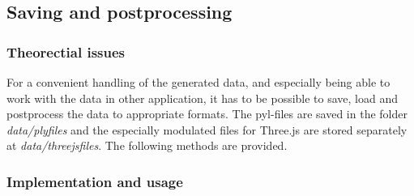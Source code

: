 \documentclass[paper=a4,11pt,bibliography=totoc]{scrartcl}
\begin{document}
\subsection{Saving and postprocessing}
\subsubsection*{\color{darkgreen}Theorectial issues}
%
For a convenient handling of the generated data, and especially being able to work with the data in other application, it has to be possible to save, load and postprocess the data to appropriate formats. The pyl-files are saved in the folder \textit{data/plyfiles} and the especially modulated files for Three.js are stored separately at \textit{data/threejsfiles}. The following methods are provided.
%
\subsubsection*{\color{darkred}Implementation and usage}
%
\end{document}
